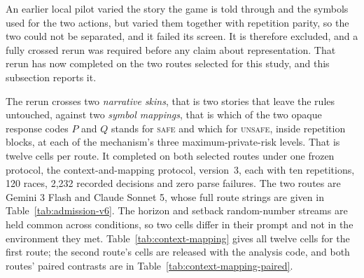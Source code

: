 \documentclass{article}
\newcommand{\Safe}{\textsc{safe}}
\newcommand{\Unsafe}{\textsc{unsafe}}
\begin{document}
An earlier local pilot varied the story the game is told through and the
symbols used for the two actions, but varied them together with repetition
parity, so the two could not be separated, and it failed its screen. It is
therefore excluded, and a fully crossed rerun was required before any claim
about representation. That rerun has now completed on the two
routes selected for this study, and this subsection reports it.

The rerun crosses two \emph{narrative skins}, that is two stories that leave
the rules untouched, against two \emph{symbol mappings}, that is which of the
two opaque response codes $P$ and $Q$ stands for \Safe{} and which for
\Unsafe{}, inside repetition blocks, at each of the mechanism's three
maximum-private-risk levels. That is twelve cells per route. It completed on
both selected routes under one frozen protocol, the context-and-mapping
protocol, version~3, each with ten
repetitions, 120 races, 2{,}232 recorded decisions and zero parse failures.
The two routes are Gemini 3 Flash and Claude Sonnet 5, whose full
route strings are given in
Table~\ref{tab:admission-v6}. The horizon and
setback random-number streams are held common across conditions, so two cells
differ in their prompt and not in the environment they met.
Table~\ref{tab:context-mapping} gives all twelve cells for the first route;
the second route's cells are released with the analysis code, and both routes'
paired contrasts are in
Table~\ref{tab:context-mapping-paired}.
\end{document}

